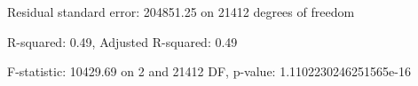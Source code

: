 Residual standard error: 204851.25 on 21412 degrees of freedom

R-squared: 0.49, Adjusted R-squared: 0.49

F-statistic: 10429.69 on 2 and 21412 DF, p-value: 1.1102230246251565e-16

